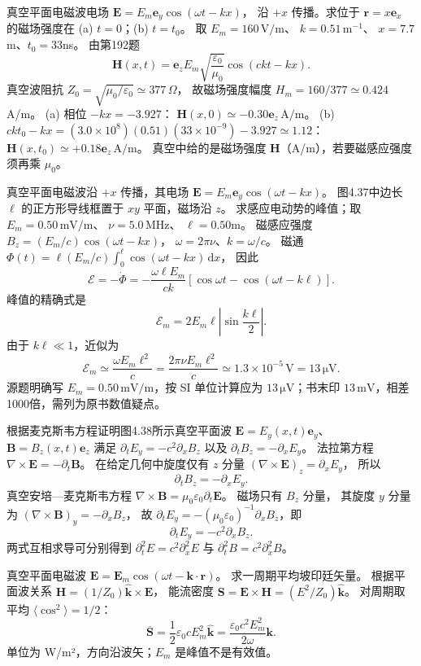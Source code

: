 真空平面电磁波电场
$\bm E=E_m\bm e_y\cos(\omega t-kx)$，
沿 $+x$ 传播。求位于
$\bm r=x\bm e_x$ 的磁场强度在
(a) $t=0$；(b) $t=t_0$。
取 $E_m=160\,\mathrm{V/m}$、
$k=0.51\,\mathrm{m^{-1}}$、
$x=7.7$m、$t_0=33$ns。
\exsolution
由第192题
\[
\boxed{\bm H(x,t)=\bm e_z E_m
\sqrt{\frac{\varepsilon_0}{\mu_0}}
\cos(ckt-kx)}.
\]
真空波阻抗
$Z_0=\sqrt{\mu_0/\varepsilon_0}\simeq377\,\Omega$，
故磁场强度幅度 $H_m=160/377\simeq0.424$A/m。
(a) 相位 $-kx=-3.927$：
$\boxed{\bm H(x,0)\simeq-0.30\bm e_z\,\mathrm{A/m}}$。
(b) $ckt_0-kx=(3.0\times10^8)(0.51)(33\times10^{-9})-3.927\simeq1.12$：
$\boxed{\bm H(x,t_0)\simeq+0.18\bm e_z\,\mathrm{A/m}}$。
\excheck 真空中给的是磁场强度 $\bm H$（A/m），若要磁感应强度须再乘 $\mu_0$。

真空平面电磁波沿 $+x$ 传播，其电场
$\bm E=E_m\bm e_y\cos(\omega t-kx)$。
图4.37中边长 $\ell$ 的正方形导线框置于 $xy$ 平面，磁场沿 $z$。
求感应电动势的峰值；取
$E_m=0.50\,\mathrm{mV/m}$、
$\nu=5.0\,\mathrm{MHz}$、
$\ell=0.50$m。
\exsolution
磁感应强度
$B_z=(E_m/c)\cos(\omega t-kx)$，
$\omega=2\pi\nu$、$k=\omega/c$。
磁通
$\Phi(t)=\ell(E_m/c)\int_0^\ell\cos(\omega t-kx)\,\mathrm dx$，
因此
\[
\mathcal E=-\dot\Phi
=-\frac{\omega\ell E_m}{ck}
\left[\cos\omega t-\cos(\omega t-k\ell)\right].
\]
峰值的精确式是
\[
\boxed{\mathcal E_m=
2E_m\ell\left|\sin\frac{k\ell}{2}\right|}.
\]
由于 $k\ell\ll1$，近似为
\[
\boxed{\mathcal E_m\simeq\frac{\omega E_m\ell^2}{c}
=\frac{2\pi\nu E_m\ell^2}{c}
\simeq1.3\times10^{-5}\,\mathrm V=13\,\mathrm{\mu V}}.
\]
\excheck 源题明确写 $E_m=0.50\,\mathrm{mV/m}$，按 SI 单位计算应为 $13\,\mathrm{\mu V}$；书末印 $13\,\mathrm{mV}$，相差1000倍，需列为原书数值疑点。

根据麦克斯韦方程证明图4.38所示真空平面波
$\bm E=E_y(x,t)\bm e_y$、
$\bm B=B_z(x,t)\bm e_z$
满足
$\partial_tE_y=-c^2\partial_xB_z$ 以及
$\partial_tB_z=-\partial_xE_y$。
\exsolution
法拉第方程
$\nabla\times\bm E=-\partial_t\bm B$。
在给定几何中旋度仅有 $z$ 分量
$(\nabla\times\bm E)_z=\partial_xE_y$，
所以
\[
\boxed{\partial_tB_z=-\partial_xE_y}.
\]
真空安培—麦克斯韦方程
$\nabla\times\bm B=\mu_0\varepsilon_0\partial_t\bm E$。
磁场只有 $B_z$ 分量，
其旋度 $y$ 分量为
$(\nabla\times\bm B)_y=-\partial_xB_z$，
故
$\partial_tE_y=-(\mu_0\varepsilon_0)^{-1}\partial_xB_z$，即
\[
\boxed{\partial_tE_y=-c^2\partial_xB_z}.
\]
\excheck 两式互相求导可分别得到
$\partial_t^2E=c^2\partial_x^2E$ 与
$\partial_t^2B=c^2\partial_x^2B$。

真空平面电磁波
$\bm E=\bm E_m\cos(\omega t-\bm k\cdot\bm r)$。
求一周期平均坡印廷矢量。
\exsolution
根据平面波关系
$\bm H=(1/Z_0)\hat{\bm k}\times\bm E$，
能流密度
$\bm S=\bm E\times\bm H
=(E^2/Z_0)\hat{\bm k}$。
对周期取平均
$\langle\cos^2\rangle=1/2$：
\[
\boxed{\overline{\bm S}=
\frac12\varepsilon_0cE_m^2\hat{\bm k}
=\frac{\varepsilon_0c^2E_m^2}{2\omega}\bm k}.
\]
\excheck 单位为 W/m²，方向沿波矢；$E_m$ 是峰值不是有效值。

